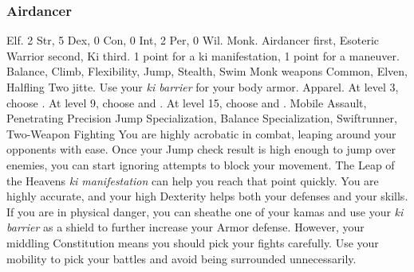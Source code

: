         \subsubsection{Airdancer}
             Elf.
             2 Str, 5 Dex, 0 Con, 0 Int, 2 Per, 0 Wil.
             Monk.
             Airdancer first, Esoteric Warrior second, Ki third.
             1 point for a ki manifestation, 1 point for a maneuver.
             Balance, Climb, Flexibility, Jump, Stealth, Swim
             Monk weapons
             Common, Elven, Halfling
             Two jitte. Use your \textit{ki barrier} for your body armor.
             Apparel.
                At level 3, choose .
                At level 9, choose  and .
                At level 15, choose  and .
             Mobile Assault, Penetrating Precision
             Jump Specialization, Balance Specialization, Swiftrunner, Two-Weapon Fighting
             You are highly acrobatic in combat, leaping around your opponents with ease.
            Once your Jump check result is high enough to jump over enemies, you can start ignoring attempts to block your movement.
            The Leap of the Heavens \textit{ki manifestation} can help you reach that point quickly.
            You are highly accurate, and your high Dexterity helps both your defenses and your skills.
            If you are in physical danger, you can sheathe one of your kamas and use your \textit{ki barrier} as a shield to further increase your Armor defense.
            However, your middling Constitution means you should pick your fights carefully.
            Use your mobility to pick your battles and avoid being surrounded unnecessarily.

